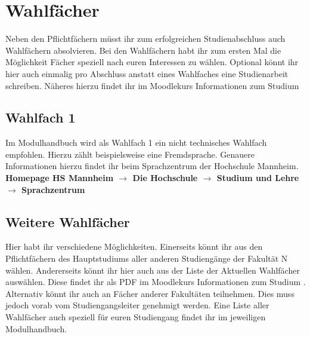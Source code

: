 \chapter{Wahlfächer}
Neben den Pflichtfächern müsst ihr zum erfolgreichen Studienabschluss auch Wahlfächern absolvieren.
Bei den Wahlfächern habt ihr zum ersten Mal die Möglichkeit Fächer speziell nach euren Interessen zu wählen.
Optional könnt ihr hier auch einmalig pro Abschluss anstatt eines Wahlfaches eine Studienarbeit schreiben.
Näheres hierzu findet ihr im Moodlekurs \glqq Informationen zum Studium \grqq   

\section{Wahlfach 1}
Im Modulhandbuch wird als Wahlfach 1 ein nicht technisches Wahlfach empfohlen.
Hierzu zählt beispielsweise eine Fremdsprache. Genauere Informationen hierzu findet ihr beim Sprachzentrum 
der Hochschule Mannheim.\\ 
\textbf{Homepage HS Mannheim \(\rightarrow\) Die Hochschule \(\rightarrow\) 
Studium und Lehre \(\rightarrow\) Sprachzentrum}

\section{Weitere Wahlfächer}
Hier habt ihr verschiedene Möglichkeiten. Einerseits könnt ihr aus den Pflichtfächern des Hauptstudiums 
aller anderen Studiengänge der Fakultät N wählen. Andererseits könnt ihr hier auch aus der Liste der Aktuellen
Wahlfächer auswählen. Diese findet ihr als PDF im Moodlekurs \glqq Informationen zum Studium \grqq.
Alternativ könnt ihr auch an Fächer anderer Fakultäten teilnehmen. Dies muss jedoch vorab vom
Studiengangsleiter genehmigt werden.  
Eine Liste aller Wahlfächer auch speziell für euren Studiengang findet ihr im jeweiligen 
Modulhandbuch.
